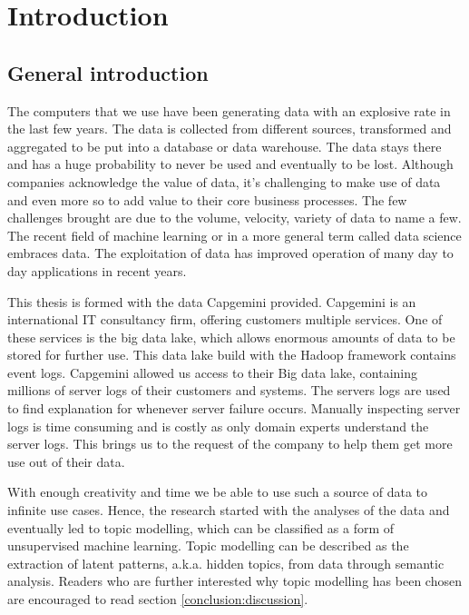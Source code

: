\chapter{Introduction} \label{ch:introduction}

\section{General introduction}\label{introduction:Generalinformation}
The computers that we use have been generating data with an explosive rate in the last few years. The data is collected from different sources, transformed and aggregated to be put into a database or data warehouse. The data stays there and has a huge probability to never be used and eventually to be lost. Although companies acknowledge the value of data, it's challenging to make use of data and even more so to add value to their core business processes. The few challenges brought are due to the volume, velocity, variety of data to name a few. The recent field of machine learning or in a more general term called data science embraces data. The exploitation of data has improved operation of many day to day applications in recent years. 

\setlength{\parindent}{3ex} This thesis is formed with the data Capgemini provided. Capgemini is an international IT consultancy firm, offering customers multiple services. One of these services is the big data lake, which allows enormous amounts of data to be stored for further use. This data lake build with the Hadoop framework contains event logs. Capgemini allowed us access to their Big data lake, containing millions of server logs of their customers and systems. The servers logs are used to find explanation for whenever server failure occurs. Manually inspecting server logs is time consuming and is costly as only domain experts understand the server logs. This brings us to the request of the company to help them get more use out of their data. 

With enough creativity and time we be able to use such a source of data to infinite use cases. Hence, the research started with the analyses of the data and eventually led to topic modelling, which can be classified as a form of unsupervised machine learning. Topic modelling can be described as the extraction of latent patterns, a.k.a. hidden topics, from data through semantic analysis. Readers who are further interested why topic modelling has been chosen are encouraged to read section \ref{conclusion:discussion}. 

